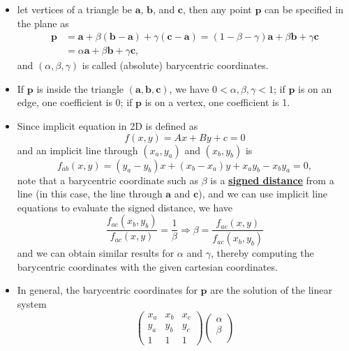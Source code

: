 \documentclass[twocolumn,landscape,10pt]{article}
\theoremstyle{definition}
\begin{document}
\begin{itemize}
    \item let vertices of a triangle be $\mathbf{a}$, $\mathbf{b}$, and $\mathbf{c}$,
        then any point $\mathbf{p}$ can be specified in the plane as
        \begin{align*}
            \mathbf{p}
            &=\mathbf{a}+\beta(\mathbf{b}-\mathbf{a})+\gamma(\mathbf{c}-\mathbf{a})
            =(1-\beta-\gamma)\mathbf{a}+\beta \mathbf{b}+\gamma \mathbf{c} \\
            &=\alpha \mathbf{a}+\beta \mathbf{b}+\gamma \mathbf{c},
        \end{align*} 
        and $(\alpha,\beta,\gamma)$ is called (absolute) barycentric coordinates.
    \item If $\mathbf{p}$ is inside the triangle
        $(\mathbf{a},\mathbf{b},\mathbf{c})$, we have $0<\alpha,\beta,\gamma<1$;
        if $\mathbf{p}$ is on an edge, one coefficient is 0;
        if $\mathbf{p}$ is on a vertex, one coefficient is 1.
    \item Since implicit equation in 2D is defined as
        \[
            f(x,y)=Ax+By+c=0
        \]
        and an implicit line through $(x_a,y_a)$ and $(x_b,y_b)$ is
        \[
            f_{ab}(x,y)=(y_a-y_b)x+(x_b-x_a)y+x_ay_b-x_by_a=0,
        \]
        note that a barycentric coordinate such as $\beta$ is a
        \underline{\textbf{signed distance}} from a line 
        (in this case, the line through $\mathbf{a}$ and $\mathbf{c}$),
        and we can use implicit line equations to evaluate the signed distance,
        we have
        \[
            \frac{f_{ac}(x_b,y_b)}{f_{ac}(x,y)}=\frac{1}{\beta}
            \Longrightarrow
            \beta=\frac{f_{ac}(x,y)}{f_{ac}(x_b,y_b)}
        \]
        and we can obtain similar results for $\alpha$ and $\gamma$, thereby
        computing the barycentric coordinates with the given cartesian coordinates.
    \item In general, the barycentric coordinates for $\mathbf{p}$ are the
        solution of the linear system
        \[
            \begin{pmatrix}
                x_a & x_b & x_c \\
                y_a & y_b & y_c \\
                1 & 1 & 1
            \end{pmatrix} 
            \begin{pmatrix}
                \alpha \\
                \beta \\

\end{pmatrix}\]
\end{itemize}
\end{document}
